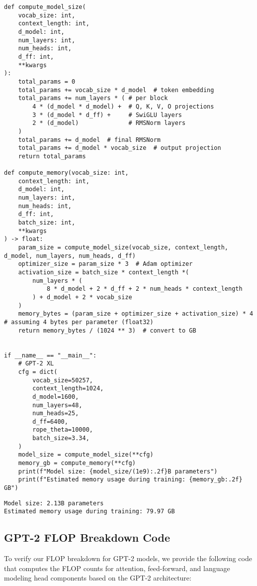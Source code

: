\begin{lstlisting}
def compute_model_size(
    vocab_size: int,
    context_length: int,
    d_model: int,
    num_layers: int,
    num_heads: int,
    d_ff: int,
    **kwargs
):
    total_params = 0
    total_params += vocab_size * d_model  # token embedding
    total_params += num_layers * ( # per block
        4 * (d_model * d_model) +  # Q, K, V, O projections
        3 * (d_model * d_ff) +     # SwiGLU layers
        2 * (d_model)              # RMSNorm layers
    )
    total_params += d_model  # final RMSNorm
    total_params += d_model * vocab_size  # output projection
    return total_params

def compute_memory(vocab_size: int,
    context_length: int,
    d_model: int,
    num_layers: int,
    num_heads: int,
    d_ff: int,
    batch_size: int,
    **kwargs
) -> float:
    param_size = compute_model_size(vocab_size, context_length, d_model, num_layers, num_heads, d_ff)
    optimizer_size = param_size * 3  # Adam optimizer
    activation_size = batch_size * context_length *(
        num_layers * (
            8 * d_model + 2 * d_ff + 2 * num_heads * context_length
        ) + d_model + 2 * vocab_size  
    )
    memory_bytes = (param_size + optimizer_size + activation_size) * 4  # assuming 4 bytes per parameter (float32)
    return memory_bytes / (1024 ** 3)  # convert to GB


if __name__ == "__main__":
    # GPT-2 XL
    cfg = dict(
        vocab_size=50257,
        context_length=1024,
        d_model=1600,
        num_layers=48,
        num_heads=25,
        d_ff=6400, 
        rope_theta=10000,
        batch_size=3.34,
    )
    model_size = compute_model_size(**cfg)
    memory_gb = compute_memory(**cfg)
    print(f"Model size: {model_size/(1e9):.2f}B parameters")
    print(f"Estimated memory usage during training: {memory_gb:.2f} GB")
\end{lstlisting}

\begin{lstlisting}
Model size: 2.13B parameters
Estimated memory usage during training: 79.97 GB
\end{lstlisting}

\subsection{GPT-2 FLOP Breakdown Code}
\label{appendix:gpt2-flop-breakdown}

To verify our FLOP breakdown for GPT-2 models, we provide the following code that computes the FLOP counts for attention, feed-forward, and language modeling head components based on the GPT-2 architecture:

